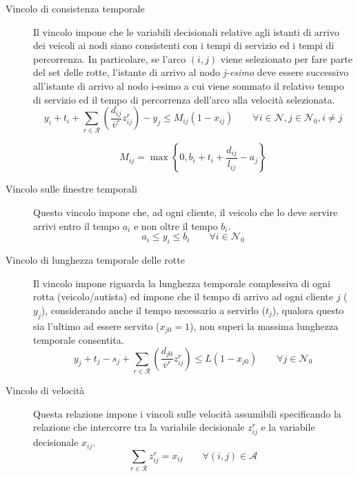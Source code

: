 \begin{description}
			\item[Vincolo di consistenza temporale]
				Il vincolo impone che le variabili decisionali relative agli istanti di arrivo dei veicoli ai nodi siano consistenti con i tempi di servizio ed i tempi di percorrenza. In particolare, se l’arco $(i,j)$ viene selezionato per fare parte del set delle rotte, l’istante di arrivo al nodo \emph{j-esimo} deve essere successivo all’istante di arrivo al nodo i-esimo a cui viene sommato il relativo tempo di servizio ed il tempo di percorrenza dell’arco alla velocità selezionata.
				\begin{equation}
					\label{eq:temporal_consistency}
					y_i + t_i + 
					\sum_{r \in \mathcal{R}} \left(\frac{d_{ij}}{\overline v^r} z_{ij}^{r}\right) - 
					y_j \leq
					M_{ij}(1 - x_{ij})
					\qquad
					\forall i \in \mathcal{N}, j \in \mathcal{N}_0, i \neq j
				\end{equation}

				$$M_{ij} = \max \left\{ 0, b_i + t_i + \frac{d_{ij}} {l_{ij}} - a_j\right\}$$

			\item[Vincolo sulle finestre temporali]
				Questo vincolo impone che, ad ogni cliente, il veicolo che lo deve servire arrivi entro il tempo $a_i$ e non oltre il tempo $b_i$.
				\begin{equation}
					\label{eq:time_windows}
					a_i \leq y_i \leq b_i
					\qquad
					\forall i \in \mathcal{N}_0
				\end{equation}

			\item[Vincolo di lunghezza temporale delle rotte]
				Il vincolo impone riguarda la lunghezza temporale complessiva di ogni rotta (veicolo/autista) ed impone che il tempo di arrivo ad ogni cliente $j$ ($y_j$), considerando anche il tempo necessario a servirlo ($t_j$), qualora questo sia l'ultimo ad essere servito ($x_{j0}=1$), non superi la massima lunghezza temporale consentita.
				\begin{equation}
					\label{eq:total_temporal_constraint}
					y_j + t_j - s_j +
					\sum_{r \in \mathcal{R}}\left(\frac{d_{j0}}{\overline v^r}z_{ij}^{r}\right)
					\leq L(1-x_{j0})
					\qquad 
					\forall j \in \mathcal{N}_0
				\end{equation} 

			\item[Vincolo di velocità]
				Questa relazione impone i vincoli sulle velocità assumibili specificando la relazione che intercorre tra la variabile decisionale $z_{ij}^r$ e la variabile decisionale $x_{ij}$.
				\begin{equation}
					\label{eq:speed_level_constraint}
					\sum_{r \in \mathcal{R}}z_{ij}^{r} = x_{ij} 
					\qquad
					\forall (i,j) \in \mathcal{A}
				\end{equation}
		\end{description}

